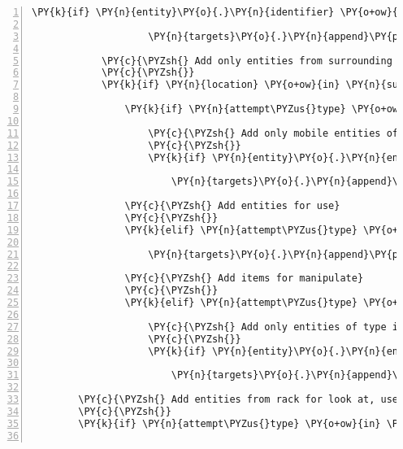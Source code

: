 \begin{Verbatim}[commandchars=\\\{\},numbers=left,firstnumber=1,stepnumber=1]
                \PY{k}{if} \PY{n}{entity}\PY{o}{.}\PY{n}{identifier} \PY{o+ow}{is} \PY{o+ow}{not} \PY{n+nb+bp}{self}\PY{o}{.}\PY{n}{host}\PY{o}{.}\PY{n}{client\PYZus{}id}\PY{p}{:}

                    \PY{n}{targets}\PY{o}{.}\PY{n}{append}\PY{p}{(}\PY{p}{(}\PY{n}{entity}\PY{p}{,} \PY{n}{location}\PY{p}{)}\PY{p}{)}

            \PY{c}{\PYZsh{} Add only entities from surrounding positions for pick up and use}
            \PY{c}{\PYZsh{}}
            \PY{k}{if} \PY{n}{location} \PY{o+ow}{in} \PY{n}{surrounding\PYZus{}positions}\PY{p}{:}

                \PY{k}{if} \PY{n}{attempt\PYZus{}type} \PY{o+ow}{is} \PY{n+nb+bp}{self}\PY{o}{.}\PY{n}{ATTEMPT\PYZus{}PICK\PYZus{}UP}\PY{p}{:}

                    \PY{c}{\PYZsh{} Add only mobile entities of type item for pickup}
                    \PY{c}{\PYZsh{}}
                    \PY{k}{if} \PY{n}{entity}\PY{o}{.}\PY{n}{entity\PYZus{}type} \PY{o+ow}{is} \PY{n}{fabula}\PY{o}{.}\PY{n}{ITEM} \PY{o+ow}{and} \PY{n}{entity}\PY{o}{.}\PY{n}{mobile}\PY{p}{:}

                        \PY{n}{targets}\PY{o}{.}\PY{n}{append}\PY{p}{(}\PY{p}{(}\PY{n}{entity}\PY{p}{,} \PY{n}{location}\PY{p}{)}\PY{p}{)}

                \PY{c}{\PYZsh{} Add entities for use}
                \PY{c}{\PYZsh{}}
                \PY{k}{elif} \PY{n}{attempt\PYZus{}type} \PY{o+ow}{is} \PY{n+nb+bp}{self}\PY{o}{.}\PY{n}{ATTEMPT\PYZus{}USE}\PY{p}{:}

                    \PY{n}{targets}\PY{o}{.}\PY{n}{append}\PY{p}{(}\PY{p}{(}\PY{n}{entity}\PY{p}{,} \PY{n}{location}\PY{p}{)}\PY{p}{)}

                \PY{c}{\PYZsh{} Add items for manipulate}
                \PY{c}{\PYZsh{}}
                \PY{k}{elif} \PY{n}{attempt\PYZus{}type} \PY{o+ow}{is} \PY{n+nb+bp}{self}\PY{o}{.}\PY{n}{ATTEMPT\PYZus{}MANIPULATE}\PY{p}{:}

                    \PY{c}{\PYZsh{} Add only entities of type item for manipulate}
                    \PY{c}{\PYZsh{}}
                    \PY{k}{if} \PY{n}{entity}\PY{o}{.}\PY{n}{entity\PYZus{}type} \PY{o+ow}{is} \PY{n}{fabula}\PY{o}{.}\PY{n}{ITEM}\PY{p}{:}

                        \PY{n}{targets}\PY{o}{.}\PY{n}{append}\PY{p}{(}\PY{p}{(}\PY{n}{entity}\PY{p}{,} \PY{n}{location}\PY{p}{)}\PY{p}{)}

        \PY{c}{\PYZsh{} Add entities from rack for look at, use and manipulate}
        \PY{c}{\PYZsh{}}
        \PY{k}{if} \PY{n}{attempt\PYZus{}type} \PY{o+ow}{in} \PY{p}{(}\PY{n+nb+bp}{self}\PY{o}{.}\PY{n}{ATTEMPT\PYZus{}LOOK\PYZus{}AT}\PY{p}{,} \PY{n+nb+bp}{self}\PY{o}{.}\PY{n}{ATTEMPT\PYZus{}USE}\PY{p}{,} \PY{n+nb+bp}{self}\PY{o}{.}\PY{n}{ATTEMPT\PYZus{}MANIPULATE}\PY{p}{)}\PY{p}{:}


\end{Verbatim}
